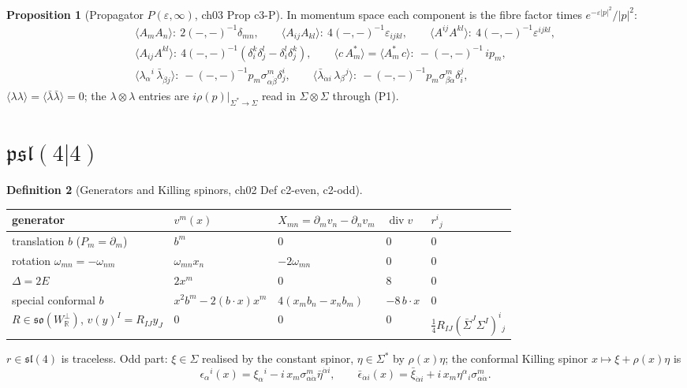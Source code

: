 \documentclass[11pt]{article}
\theoremstyle{definition}
\newtheorem{definition}{Definition}[section]
\newtheorem{proposition}[definition]{Proposition}
\begin{document}
\begin{proposition}[Propagator $P(\varepsilon,\infty)$, ch03 Prop c3-P]\label{prop:prop}
In momentum space each component is the fibre factor times $e^{-\varepsilon|p|^2}/|p|^2$:
\begin{gather*}
\langle A_mA_n\rangle:\ 2(-,-)^{-1}\delta_{mn},\qquad \langle A_{ij}A_{kl}\rangle:\ 4(-,-)^{-1}\varepsilon_{ijkl},\qquad \langle A^{ij}A^{kl}\rangle:\ 4(-,-)^{-1}\varepsilon^{ijkl},\\
\langle A_{ij}A^{kl}\rangle:\ 4(-,-)^{-1}(\delta_i^k\delta_j^l-\delta_i^l\delta_j^k),\qquad \langle c\,A^*_m\rangle=\langle A^*_m\,c\rangle:\ -(-,-)^{-1}\,ip_m,\\
\langle\lambda_\alpha{}^i\,\bar\lambda_{\dot\beta j}\rangle:\ -(-,-)^{-1}p_m\sigma^m_{\alpha\dot\beta}\delta^i_j,\qquad
\langle\bar\lambda_{\dot\alpha i}\,\lambda_\beta{}^j\rangle:\ -(-,-)^{-1}p_m\sigma^m_{\beta\dot\alpha}\delta_i^j ,
\end{gather*}
$\langle\lambda\lambda\rangle=\langle\bar\lambda\bar\lambda\rangle=0$; the $\lambda\otimes\lambda$ entries are $i\rho(p)|_{\Sigma^*\to\Sigma}$ read in $\Sigma\otimes\Sigma$ through (P1).
\end{proposition}

\section{$\mathfrak{psl}(4|4)$}

\begin{definition}[Generators and Killing spinors, ch02 Def c2-even, c2-odd]\label{def:gen}\ 
\begin{center}\small
\begin{tabular}{l|l|l|l|l}
generator & $v^m(x)$ & $X_{mn}=\partial_mv_n-\partial_nv_m$ & $\operatorname{div}v$ & $r^i{}_j$ \\
\hline
translation $b$ ($P_m=\partial_m$) & $b^m$ & $0$ & $0$ & $0$ \\
rotation $\omega_{mn}=-\omega_{nm}$ & $\omega_{mn}x_n$ & $-2\omega_{mn}$ & $0$ & $0$ \\
$\Delta=2E$ & $2x^m$ & $0$ & $8$ & $0$ \\
special conformal $b$ & $x^2b^m-2(b\cdot x)x^m$ & $4(x_mb_n-x_nb_m)$ & $-8\,b\cdot x$ & $0$ \\
$R\in\mathfrak{so}(W_{\mathbb R}^\perp)$, $v(y)^I=R_{IJ}y_J$ & $0$ & $0$ & $0$ & $\tfrac14R_{IJ}(\bar\Sigma^J\Sigma^I)^i{}_j$ \\
\end{tabular}
\end{center}

$r\in\mathfrak{sl}(4)$ is traceless. Odd part: $\xi\in\Sigma$ realised by the constant spinor, $\eta\in\Sigma^*$ by $\rho(x)\eta$; the conformal Killing spinor $x\mapsto\xi+\rho(x)\eta$ is
\begin{equation}\tag{K1}
\epsilon_\alpha{}^i(x)=\xi_\alpha{}^i-i\,x_m\sigma^m_{\alpha\dot\alpha}\bar\eta^{\dot\alpha i},\qquad \bar\epsilon_{\dot\alpha i}(x)=\bar\xi_{\dot\alpha i}+i\,x_m\eta^\alpha{}_i\sigma^m_{\alpha\dot\alpha}.
\end{equation}
\end{definition}
\end{document}
